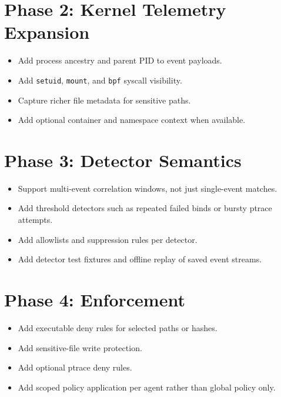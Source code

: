 \documentclass[
  12pt,
]{report}
\providecommand{\tightlist}{%
  \setlength{\itemsep}{0pt}\setlength{\parskip}{0pt}}
\begin{document}
\section{Phase 2: Kernel Telemetry
Expansion}\label{phase-2-kernel-telemetry-expansion}

\begin{itemize}
\tightlist
\item
  Add process ancestry and parent PID to event payloads.
\item
  Add \texttt{setuid}, \texttt{mount}, and \texttt{bpf} syscall
  visibility.
\item
  Capture richer file metadata for sensitive paths.
\item
  Add optional container and namespace context when available.
\end{itemize}

\section{Phase 3: Detector Semantics}\label{phase-3-detector-semantics}

\begin{itemize}
\tightlist
\item
  Support multi-event correlation windows, not just single-event
  matches.
\item
  Add threshold detectors such as repeated failed binds or bursty ptrace
  attempts.
\item
  Add allowlists and suppression rules per detector.
\item
  Add detector test fixtures and offline replay of saved event streams.
\end{itemize}

\section{Phase 4: Enforcement}\label{phase-4-enforcement}

\begin{itemize}
\tightlist
\item
  Add executable deny rules for selected paths or hashes.
\item
  Add sensitive-file write protection.
\item
  Add optional ptrace deny rules.
\item
  Add scoped policy application per agent rather than global policy
  only.
\end{itemize}
\end{document}
